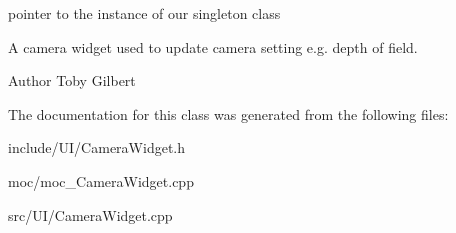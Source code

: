pointer to the instance of our singleton class 

A camera widget used to update camera setting e.\-g. depth of field.

\begin{DoxyAuthor}{Author}
Toby Gilbert 
\end{DoxyAuthor}


The documentation for this class was generated from the following files\-:\begin{DoxyCompactItemize}
\item 
include/\-U\-I/Camera\-Widget.\-h\item 
moc/moc\-\_\-\-Camera\-Widget.\-cpp\item 
src/\-U\-I/Camera\-Widget.\-cpp\end{DoxyCompactItemize}
